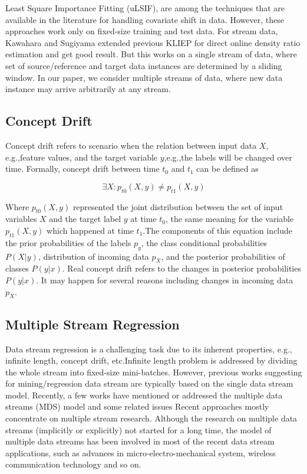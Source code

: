 Least Square Importance Fitting (uLSIF)\cite{kanamori}, are among the techniques that 
are available in the literature for handling covariate shift in data. However, these 
approaches work only on fixed-size training and test data. For stream data, Kawahara 
and Sugiyama\cite{kawahara} extended previous KLIEP for direct online density ratio 
estimation and get good result. But this works on a single stream of data, where set 
of source/reference and target data instances are determined by a sliding window. In 
our paper, we consider multiple streams of data, where new data instance may arrive 
arbitrarily at any stream.


\subsection{Concept Drift}
\label{notations}
  Concept drift refers to scenario when the relation between input data $X$, e.g.,feature values, and the target variable $y$,e.g.,the labels will be changed over time. Formally, concept drift between time $t_0$ and $t_1$ can be defined as

\begin{equation}
   \exists X: p_{t0}(X,{y}) \ne p_{t1}(X,{y})
\end{equation} 

Where $p_{t0}(X,{y})$ represented the joint distribution between the set of input 
variables $X$ and the target label $y$ at time $t_{0}$, the same meaning for the 
variable $p_{t1}(X,{y})$ which happened at time $t_{1}$\cite{gama_survey}.The  
components of this equation include the prior probabilities of the labels
$p_{y}$, the class conditional probabilities $P(X \vert {y})$, distribution of incoming data $p_{X}$, and  the  posterior  probabilities  of  classes $P(y \vert 
{x})$. Real concept drift refers  to  the  changes  in  posterior  probabilities $P(y \vert {x})$. It may happen for several reasons including changes  in  incoming  data $p_{X}$.
  
  




\subsection{Multiple Stream Regression}
\label{statement}

Data stream regression is a challenging task due to its  inherent properties, e.g., 
infinite length, concept drift, etc.Infinite length problem is addressed by dividing 
the whole stream into fixed-size mini-batches. However, previous  works  suggesting for  mining/regression  data  stream are  typically  based  on  the  single  data stream model. Recently, a few works have mentioned or addressed the multiple  data  streams (MDS) model  and  some  related  issues Recent approaches mostly concentrate on multiple stream research. Although the research on multiple data streams (implicitly or explicitly) not started for a long time, the  model of multiple  data  streams  has been involved  in  most  of  the recent  data  stream  applications, such as advances  in  micro-electro-mechanical  system, wireless  communication  technology and so on.

